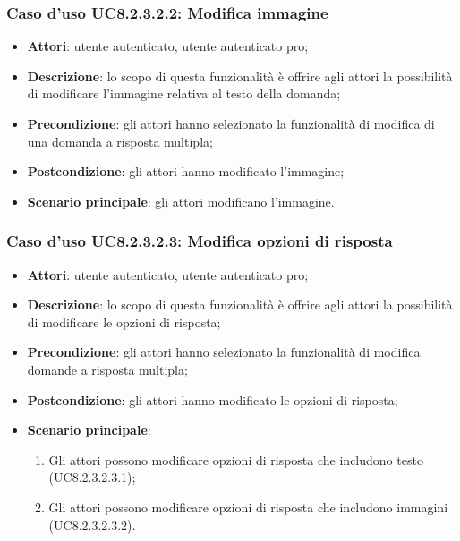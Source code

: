 \subsubsection{Caso d'uso UC8.2.3.2.2: Modifica immagine}
	\begin{itemize}
		\item
			\textbf{Attori}: utente autenticato, utente autenticato pro;
		\item		
			\textbf{Descrizione}: lo scopo di questa funzionalità è offrire agli attori la possibilità di modificare l'immagine relativa al testo della domanda;
		\item
			\textbf{Precondizione}: gli attori hanno selezionato la funzionalità di modifica di una domanda a risposta multipla; 
		\item
			\textbf{Postcondizione}: gli attori hanno modificato l'immagine;
		\item
			\textbf{Scenario principale}: gli attori modificano l'immagine. 	
	\end{itemize}
	
	
\subsubsection{Caso d'uso UC8.2.3.2.3: Modifica opzioni di risposta}
	\begin{itemize}
		\item
			\textbf{Attori}: utente autenticato, utente autenticato pro;
		\item		
			\textbf{Descrizione}: lo scopo di questa funzionalità è offrire agli attori la possibilità di modificare le opzioni di risposta;
		\item
			\textbf{Precondizione}: gli attori hanno selezionato la funzionalità di modifica domande a risposta multipla; 
		\item
			\textbf{Postcondizione}: gli attori hanno modificato le opzioni di risposta;
		\item
			\textbf{Scenario principale}:
	       		\begin{enumerate}
	       			\item
	       			Gli attori possono modificare opzioni di risposta che includono testo (UC8.2.3.2.3.1);
					\item
					Gli attori possono modificare opzioni di risposta che includono immagini (UC8.2.3.2.3.2).
	 			\end{enumerate}
	\end{itemize}	
	
